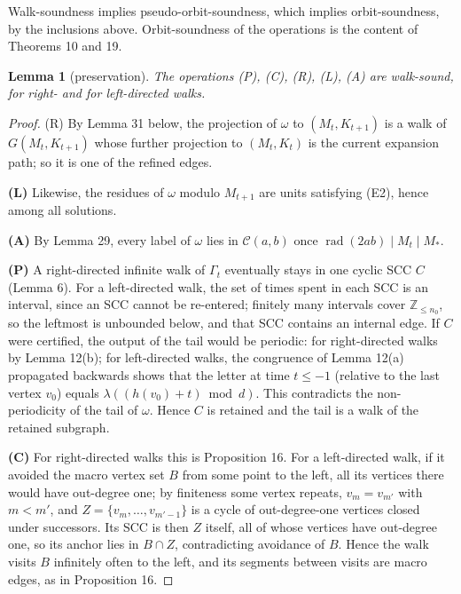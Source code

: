 \documentclass[11pt,reqno]{amsart}
\newtheorem{lemma}[theorem]{Lemma}
\theoremstyle{definition}
\theoremstyle{remark}
\begin{document}
Walk-soundness implies pseudo-orbit-soundness, which implies
orbit-soundness, by the inclusions above. Orbit-soundness of the
operations is the content of Theorems 10 and 19.

\begin{samepage}
\begin{lemma}[preservation]\leavevmode\label{thm:30}
The operations (P), (C), (R), (L), (A) are
walk-sound, for right- and for left-directed walks.
\label{thm-end:30}
\end{lemma}
\end{samepage}

\begin{proof}\leavevmode\label{proof:30}
(R) By Lemma 31 below, the projection of \(\omega\) to
\((M_t,K_{t+1})\) is a walk of \(G(M_t,K_{t+1})\) whose further
projection to \((M_t,K_t)\) is the current expansion path; so it is one of
the refined edges.

\textbf{(L)} Likewise, the residues of \(\omega\) modulo
\(M_{t+1}\) are units satisfying (E2), hence among all solutions.

\textbf{(A)} By
Lemma 29, every label of \(\omega\) lies in \(\mathcal C(a,b)\) once
\(\operatorname{rad}(2ab)\mid M_t\mid M_*\).

\textbf{(P)} A right-directed infinite
walk of \(\Gamma_t\) eventually stays in one cyclic SCC \(C\)
(Lemma 6). For a left-directed walk, the set of times spent in each SCC
is an interval, since an SCC cannot be re-entered; finitely many
intervals cover \(\mathbb Z_{\le n_0}\), so the leftmost is unbounded
below, and that SCC contains an internal edge. If \(C\) were certified,
the output of the tail would be periodic: for right-directed walks by
Lemma 12(b); for left-directed walks, the congruence of Lemma 12(a)
propagated backwards shows that the letter at time \(t\le-1\) (relative
to the last vertex \(v_0\)) equals \(\lambda((h(v_0)+t)\bmod d)\). This
contradicts the non-periodicity of the tail of \(\omega\). Hence \(C\)
is retained and the tail is a walk of the retained subgraph.

\textbf{(C)} For
right-directed walks this is Proposition 16. For a left-directed walk, if
it avoided the macro vertex set \(B\) from some point to the left, all
its vertices there would have out-degree one; by finiteness some vertex
repeats, \(v_m=v_{m'}\) with \(m<m'\), and \(Z=\{v_m,\ldots,v_{m'-1}\}\)
is a cycle of out-degree-one vertices closed under successors. Its SCC
is then \(Z\) itself, all of whose vertices have out-degree one, so its
anchor lies in \(B\cap Z\), contradicting avoidance of \(B\). Hence the
walk visits \(B\) infinitely often to the left, and its segments between
visits are macro edges, as in Proposition 16. \qedhere
\end{proof}
\end{document}
